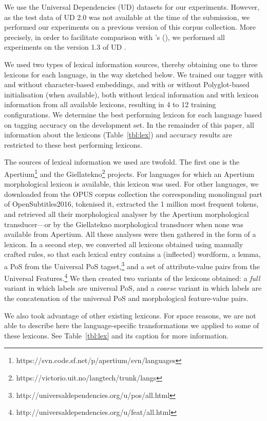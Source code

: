 \documentclass[11pt,letterpaper]{article}
\begin{document}
We use the Universal Dependencies (UD) datasets for our experiments. However, as the test data of UD 2.0 was not
available at the time of the submission, we performed our experiments on a previous version of this corpus
collection. More precisely, in order to facilitate comparison with \citeauthor{plank16}'s (\citeyear{plank16}), we
performed all experiments on the version 1.3 of UD \cite{ud13}.

We used two types of lexical information sources, thereby obtaining one to three lexicons for each language, in the way
sketched below. We trained our tagger with and without character-based embeddings, and with or without Polyglot-based
initialisation (when available), both without lexical information and with lexicon information from all available
lexicons, resulting in 4 to 12 training configurations. We determine the best performing lexicon for each language based
on tagging accuracy on the development set. In the remainder of this paper, all information about the lexicons
(Table~\ref{tbl:lex}) and accuracy results are restricted to these best performing lexicons.

The sources of lexical information we used are twofold. The first one is the
Apertium\footnote{https://svn.code.sf.net/p/apertium/svn/languages} and the
Giellatekno\footnote{https://victorio.uit.no/langtech/trunk/langs} projects. For languages for which an Apertium
morphological lexicon is available, this lexicon was used. For other languages, we downloaded from the OPUS corpus
collection the corresponding monolingual part of OpenSubtitles2016, tokenised it, extracted the 1 million most frequent
tokens, and retrieved all their morphological analyser by the Apertium morphological transducer---or by the Giellatekno
morphological transducer when none was available from Apertium. All these analyses were then gathered in the form of a
lexicon. In a second step, we converted all lexicons obtained using manually crafted rules, so that each lexical entry
contains a (inflected) wordform, a lemma, a PoS from the Universal PoS
tagset,\footnote{http://universaldependencies.org/u/pos/all.html} and a set of attribute-value pairs from the Universal
Features.\footnote{http://universaldependencies.org/u/feat/all.html} We then created two variants of the lexicons
obtained: a {\em full} variant in which labels are universal PoS, and a {\em coarse} variant in which labels are the
concatenation of the universal PoS and morphological feature-value pairs.

We also took advantage of other existing lexicons. For space reasons, we are not able to describe here the language-specific
transformations we applied to some of these lexicons. See Table~\ref{tbl:lex} and its caption for more information.
\end{document}
